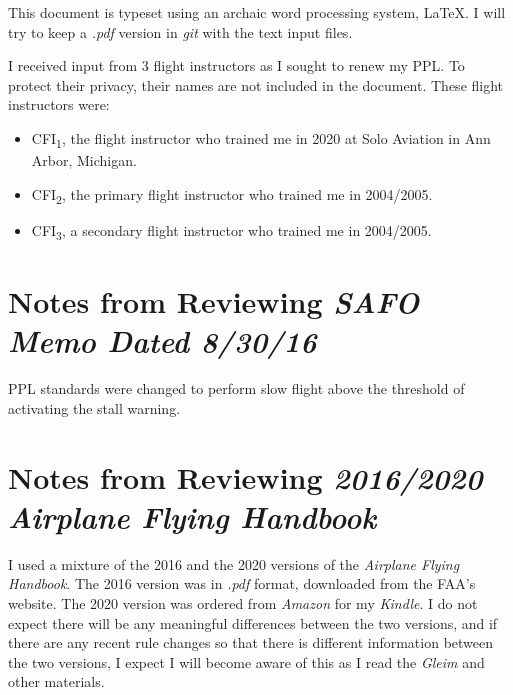 \documentclass[letterpaper,10pt,titlepage]{article}
\begin{document}
This document is typeset using an archaic word processing system, \LaTeX{}.
I will try to keep a \emph{.pdf} version in \emph{git} with the text input
files.

I received input from 3 flight instructors as I sought to renew my PPL.
To protect their privacy, their names are not included in the document.
These flight instructors were:

\begin{itemize}
   \item CFI\textsubscript{1}, the flight instructor who trained me in 2020
         at Solo Aviation in Ann Arbor, Michigan.
   \item CFI\textsubscript{2}, the primary flight instructor who trained me
         in 2004/2005.
   \item CFI\textsubscript{3}, a secondary flight instructor who trained me
         in 2004/2005.
\end{itemize}



\section{Notes from Reviewing \emph{SAFO Memo Dated 8/30/16}}
\label{ssaf0}

PPL standards were changed to perform slow flight above the threshold
of activating the stall warning.


\section{Notes from Reviewing \emph{2016/2020 Airplane Flying Handbook}}
\label{snra0}

I used a mixture of the 2016 and the 2020 versions of the \emph{Airplane Flying
Handbook}.  The 2016 version was in \emph{.pdf} format, downloaded from the
FAA's website.  The 2020 version was ordered from \emph{Amazon} for my
\emph{Kindle}.  I do not expect there will be any meaningful differences between
the two versions, and if there are any recent rule changes so that there is
different information between the two versions, I expect I will become aware
of this as I read the \emph{Gleim} and other materials.

\end{document}
